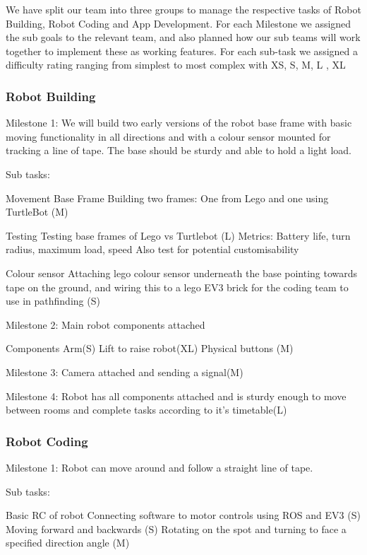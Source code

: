 \documentclass{article}
\begin{document}
We have split our team into three groups to manage the respective tasks of Robot Building, Robot Coding and App Development. For each Milestone we assigned the sub goals to the relevant team, and also planned how our sub teams will work together to implement these as working features.
For each sub-task we assigned a difficulty rating ranging from simplest to most complex with XS, S, M, L , XL


\subsubsection{Robot Building}

Milestone 1: We will build two early versions of the robot base frame with basic moving functionality in all directions and with a colour sensor mounted for tracking a line of tape. The base should be sturdy and able to hold a light load. 

Sub tasks:

Movement Base Frame
    Building two frames: One from Lego and one using TurtleBot (M)
    
Testing
    Testing base frames of Lego vs Turtlebot (L)
    Metrics: Battery life, turn radius, maximum load, speed
    Also test for potential customisability
    
Colour sensor
    Attaching lego colour sensor underneath the base pointing towards tape on the ground, and wiring this to a lego EV3 brick for the       coding team to use in pathfinding (S)
    
Milestone 2: Main robot components attached

Components
    Arm(S)
    Lift to raise robot(XL)
    Physical buttons (M)
    
Milestone 3: Camera attached and sending a signal(M)

Milestone 4: Robot has all components attached and is sturdy enough to move between rooms and complete tasks according to it's timetable(L) 


\subsubsection{Robot Coding}

Milestone 1: Robot can move around and follow a straight line of tape.

Sub tasks: 

Basic RC of robot
    Connecting software to motor controls using ROS and EV3 (S)
    Moving forward and backwards (S)
    Rotating on the spot and turning to face a specified direction angle (M)
    
\end{document}
